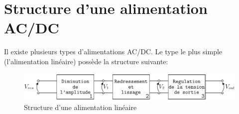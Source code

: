 \documentclass{../template/labo}
\begin{document}


\section{Structure d'une alimentation AC/DC}
Il existe plusieurs types d'alimentations AC/DC. Le type le plus simple (l'alimentation linéaire) possède la structure suivante:

\begin{figure}[h!]
	\begin{center}
		\includegraphics[width=\linewidth]{figures/alim.pdf}
	\end{center}
\caption{Structure d'une alimentation linéaire}
\label{fig:alim}
\end{figure}
\end{document}
